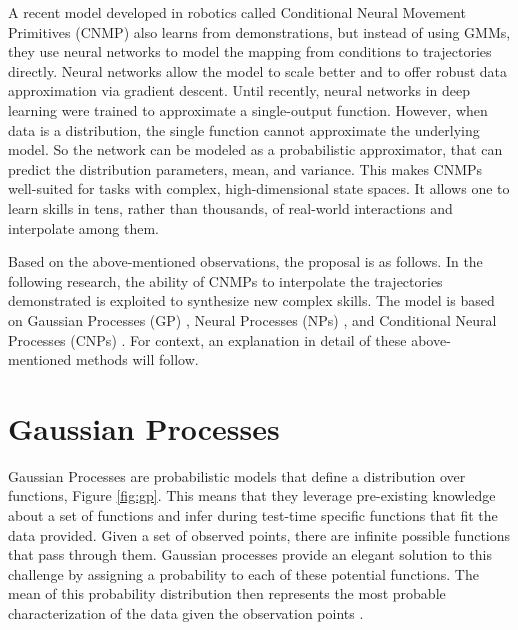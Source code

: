 A recent model developed in robotics called Conditional Neural Movement Primitives (CNMP) \cite{Ugur-RSS-19} also learns from demonstrations, but instead of using GMMs, they use neural networks to model the mapping from conditions to trajectories directly. Neural networks allow the model to scale better and to offer robust data approximation via gradient descent. Until recently, neural networks in deep learning were trained to approximate a single-output function. However, when data is a distribution, the single function cannot approximate the underlying model. So the network can be modeled as a probabilistic approximator, that can predict the distribution parameters, mean, and variance. This makes CNMPs well-suited for tasks with complex, high-dimensional state spaces. It allows one to learn skills in tens, rather than thousands, of real-world interactions and interpolate among them.

Based on the above-mentioned observations, the proposal is as follows.
In the following research, the ability of CNMPs to interpolate the trajectories demonstrated is exploited to synthesize new complex skills. 
The model is based on Gaussian Processes (GP) \cite{seeger2004gaussian}, Neural Processes (NPs) \cite{garnelo2018neural}, and  Conditional Neural Processes (CNPs) \cite{DBLP:journals/corr/abs-1807-01613}.
For context, an explanation in detail of these above-mentioned methods will follow.



\section{Gaussian Processes}
Gaussian Processes \cite{seeger2004gaussian} are probabilistic models that define a distribution over functions, Figure \ref{fig:gp}.
This means that they leverage pre-existing knowledge about a set of functions and infer during test-time specific functions that fit the data provided. Given a set of observed points, there are infinite possible functions that pass through them. Gaussian processes provide an elegant solution to this challenge by assigning a probability to each of these potential functions. The mean of this probability distribution then represents the most probable characterization of the data given the observation points \cite{Goertler2018VisualExplorationGaussian}. 

